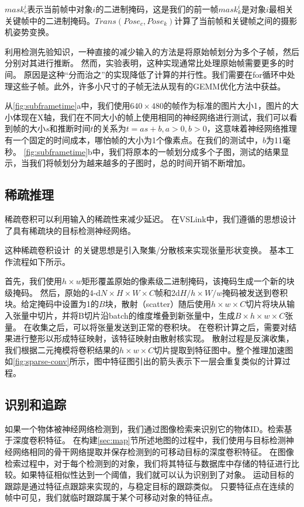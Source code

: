 $mask_c^i$表示当前帧中对象$i$的二进制掩码，这是我们的前一帧$mask_k^i$是对象$i$最相关关键帧中的二进制掩码。$Trans(Pose_c, Pose_k)$计算了当前帧和关键帧之间的摄影机姿势变换。

利用检测先验知识，一种直接的减少输入的方法是将原始帧划分为多个子帧，然后分别对其进行推断。
然而，实验表明，这种实现通常比处理原始帧需要更多的时间。
原因是这种“分而治之”的实现降低了计算的并行性。我们需要在for循环中处理这些子帧。此外，许多小尺寸的子帧无法从现有的GEMM优化方法中获益。

从\autoref{fig:subframetime}a中，我们使用$640\times 480$的帧作为标准的图片大小1，图片的大小体现在X轴，我们在不同大小的帧上使用相同的神经网络进行测试，我们可以看到帧的大小$s$和推断时间$t$的关系为$t = as + b, a>0,b >0$，这意味着神经网络推理有一个固定的时间成本，哪怕帧的大小为1个像素点。在我们的测试中，$b$为11毫秒。
\autoref{fig:subframetime}b中，我们将原本的一帧划分成多个子图，测试的结果显示，当我们将帧划分为越来越多的子图时，总的时间开销不断增加。
 
\subsection{稀疏推理}
稀疏卷积\cite{graham2015sparse,ren2018sbnet}可以利用输入的稀疏性来减少延迟。
在VSLink中，我们遵循\cite{ren2018sbnet}的思想设计了具有稀疏块的目标检测神经网络。

这种稀疏卷积设计~\cite{ren2018sbnet}的关键思想是引入聚集/分散核来实现张量形状变换。
基本工作流程如下所示。

首先，我们使用$h\times w$矩形覆盖原始的像素级二进制掩码，该掩码生成一个新的块级掩码。
然后，原始的4-d$N \times H \times W \times C$帧和2d$H/h \times W/w$掩码被发送到卷积块。给定掩码中设置为1的$B$块，散射（scatter）随后使用$h\times w \times C$切片将块从输入张量中切片，并将B切片沿batch的维度堆叠到新张量中，生成$B\times h \times w \times C$张量。
在收集之后，可以将张量发送到正常的卷积块。
在卷积计算之后，需要对结果进行整形以形成特征映射，该特征映射由散射核实现。
散射过程是反演收集，我们根据二元掩模将卷积结果的$h\times w \times C$切片提取到特征图中。整个推理加速图如\autoref{fig:sparse-conv}所示，图中特征图引出的箭头表示下一层会重复类似的计算过程。


\subsection{识别和追踪}
如果一个物体被神经网络检测到，我们通过图像检索来识别它的物体ID。检索基于深度卷积特征。
在构建\ref{sec:map}节所述地图的过程中，我们使用与目标检测神经网络相同的骨干网络提取并保存检测到的可移动目标的深度卷积特征。
在图像检索过程中，对于每个检测到的对象，我们将其特征与数据库中存储的特征进行比较。如果特征相似性达到一个阈值，我们就可以认为识别到了对象。
运动目标的跟踪是通过特征点跟踪来实现的，与稳定目标的跟踪类似。
只要特征点在连续的帧中可见，我们就临时跟踪属于某个可移动对象的特征点。

